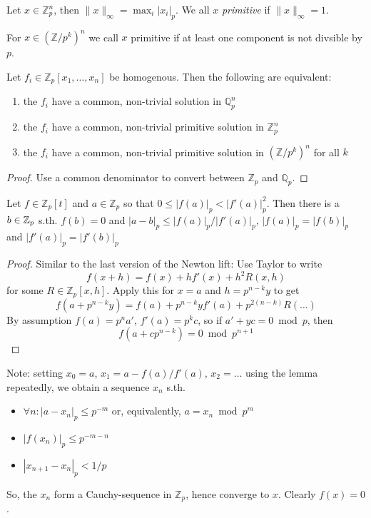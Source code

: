 \begin{definition}
  Let $x\in \mathbb Z_p^n$, then $\|x\|_\infty = \max_i |x_i|_p$. We all
  $x$ {\em primitive} if $\|x\|_\infty = 1$.

  For $x\in (\mathbb Z/p^k)^n$ we call $x$ primitive if at least one component
  is not divsible by $p$.
\end{definition}

\begin{lemma}
  Let $f_i\in \mathbb Z_p[x_1, \ldots, x_n]$ be homogenous. Then the following are 
  equivalent:
  \begin{enumerate}
    \item the $f_i$ have a common, non-trivial solution in $\mathbb Q_p^n$
    \item the $f_i$ have a common, non-trivial primitive solution in $\mathbb Z_p^n$
    \item the $f_i$ have a common, non-trivial primitive solution in 
      $(\mathbb Z/p^k)^n$ for all $k$
  \end{enumerate}
\end{lemma}
\begin{proof}
  Use a common denominator to convert between $\mathbb Z_p$ and $\mathbb Q_p$.
\end{proof}

\begin{lemma}[Newton - 2]\label{newton-2}
  Let $f\in \mathbb Z_p[t]$ and $a\in \mathbb Z_p$ so that
  $0\le|f(a)|_p < |f'(a)|_p^2$. Then there is a $b\in {\mathbb Z}_p$ s.th.
  $f(b) = 0$ and $|a-b|_p\le |f(a)|_p/|f'(a)|_p$, $|f(a)|_p = |f(b)|_p$
  and $|f'(a)|_p = |f'(b)|_p$
\end{lemma}
\begin{proof}
  Similar to the last version of the Newton lift:
  Use Taylor to write
  $$f(x+h) = f(x) + hf'(x) + h^2R(x, h)$$
  for some $R\in \mathbb Z_p[x, h]$.
  Apply this for $x=a$ and $h = p^{n-k}y$ to get
  $$f(a+p^{n-k}y) = f(a) + p^{n-k}y f'(a) + p^{2(n-k)}R(\ldots)$$
  By assumption $f(a) = p^n a'$, $f'(a) = p^k c$, so if
  $a' + yc = 0 \bmod p$, then 
  $$f(a+cp^{n-k}) = 0 \bmod p^{n+1}$$
\end{proof}
Note: setting $x_0 = a$, $x_1 = a-f(a)/f'(a)$, $x_2=\ldots$ using the lemma
repeatedly, we obtain a sequence $x_n$ s.th.
\begin{itemize}
  \item $\forall n: |a-x_n|_p \le p^{-m}$ or, equivalently, $a = x_n \bmod p^m$
  \item $|f(x_n)|_p \le p^{-m-n}$
  \item $|x_{n+1} - x_n|_p < 1/p$
\end{itemize}
So, the $x_n$ form a Cauchy-sequence in $\mathbb Z_p$, hence converge to $x$.
Clearly $f(x) = 0$.

